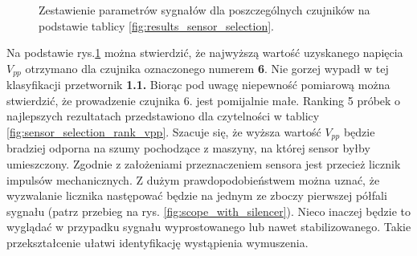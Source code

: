 \begin{figure}[htbp]
  \centering
  
\pgfplotsset{compat=1.12}

\caption{Zestawienie parametrów sygnałów dla poszczególnych czujników na
 podstawie tablicy \ref{fig:results_sensor_selection}.}
\label{fig:sensor_statistic}
\end{figure}


\indent Na podstawie rys.\ref{fig:sensor_statistic} można stwierdzić, że najwyższą wartość
 uzyskanego napięcia $V_{pp}$ otrzymano dla czujnika oznaczonego numerem \textbf{6}.
 Nie gorzej wypadł w tej klasyfikacji przetwornik \textbf{1.1.} Biorąc pod uwagę
 niepewność pomiarową można stwierdzić, że prowadzenie czujnika 6. jest pomijalnie małe.
 Ranking 5 próbek o najlepszych rezultatach przedstawiono dla czytelności w tablicy 
 \ref{fig:sensor_selection_rank_vpp}. 
 \indent Szacuje się, że wyższa wartość $V_{pp}$ będzie bradziej odporna na szumy pochodzące 
 z maszyny, na której sensor byłby umieszczony. Zgodnie z założeniami przeznaczeniem 
 sensora jest przecież licznik impulsów mechanicznych. Z dużym prawdopodobieństwem 
 można uznać, że wyzwalanie licznika następować będzie na jednym ze zboczy pierwszej 
 półfali sygnału (patrz przebieg na rys. \ref{fig:scope_with_silencer}). Nieco inaczej będzie to wyglądać w przypadku sygnału wyprostowanego
 lub nawet stabilizowanego. Takie przekształcenie ułatwi identyfikację wystąpienia 
 wymuszenia. 

